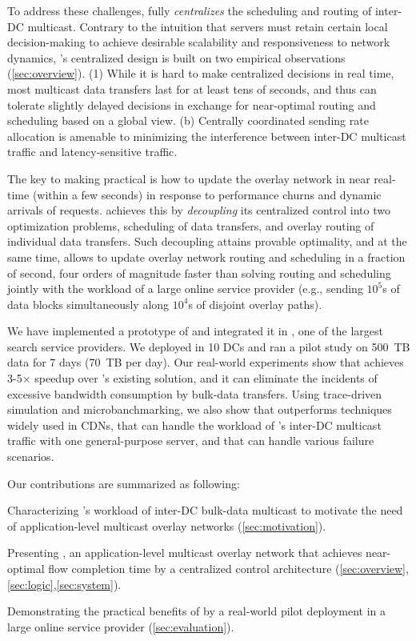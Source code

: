 To address these challenges, \name fully {\em centralizes} the 
scheduling and routing of inter-DC multicast. Contrary to the 
intuition that servers must retain certain local decision-making to 
achieve desirable scalability and responsiveness to network dynamics, 
\name's centralized design is built on two empirical observations 
(\Section\ref{sec:overview}).
(1) While it is hard to make centralized decisions in real time, most
multicast data transfers last for at least tens of seconds, and thus 
can tolerate slightly delayed decisions in exchange for near-optimal 
routing and scheduling based on a global view.
(b) Centrally coordinated sending rate allocation is amenable to 
minimizing the interference between inter-DC multicast traffic and 
latency-sensitive traffic.

The key to making \name practical is how to update the overlay 
network in near real-time (within a few seconds) in response to 
performance churns and dynamic arrivals of requests. \name achieves
this by {\em decoupling} its centralized control into two 
optimization problems, scheduling of data transfers, and overlay 
routing of individual data transfers. Such decoupling attains 
provable optimality, and at the same time, allows \name to update 
overlay network routing and scheduling in a fraction of second, four
orders of magnitude faster than solving routing and scheduling jointly 
with the workload of a large online service provider (e.g., sending 
$10^5$s of data blocks simultaneously along $10^4$s of disjoint 
overlay paths).


We have implemented a prototype of \name and integrated it in 
\company, one of the largest search service providers. We deployed 
\name in 10 DCs and ran a pilot study on 500~TB data 
for 7 days (70~TB per day).
Our real-world experiments show that \name achieves 3-5$\times$
speedup over \company's existing solution, and it can eliminate the 
incidents of excessive bandwidth consumption by bulk-data transfers.
Using trace-driven simulation and microbanchmarking, we also show 
that \name outperforms techniques widely used in CDNs, that \name 
can handle the workload of \company's inter-DC multicast traffic with
one general-purpose server, and that \name can handle various 
failure scenarios.


Our contributions are summarized as following:
\begin{packeditemize}
\item Characterizing \company's workload of inter-DC bulk-data 
multicast to motivate the need of application-level multicast 
overlay networks (\Section\ref{sec:motivation}).
\item Presenting \name, an application-level multicast overlay 
network that achieves near-optimal flow completion time by a 
centralized control architecture 
(\Section\ref{sec:overview},\ref{sec:logic},\ref{sec:system}).
\item Demonstrating the practical benefits of \name by a real-world
pilot deployment in a large online service provider 
(\Section\ref{sec:evaluation}).
\end{packeditemize}
